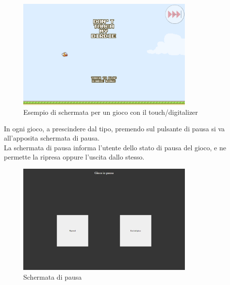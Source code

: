 \begin{figure}[h]
    \centering
    \includegraphics[width=250pt]{images/product/schermataGiocoTouchDigit.png}
    \caption{Esempio di schermata per un gioco con il touch/digitalizer}
    \label{fig:schermataGiocoTouchDigit}
\end{figure}
\newpage
In ogni gioco, a prescindere dal tipo, premendo sul pulsante di pausa si va all'apposita schermata di pausa.\\
La schermata di pausa informa l'utente dello stato di pausa del gioco, e ne permette la ripresa oppure l'uscita dallo stesso.
\begin{figure}[h]
    \centering
    \includegraphics[width=250pt]{images/product/schermataPausaGioco.png}
    \caption{Schermata di pausa}
    \label{fig:schermataPausaGioco}
\end{figure}
